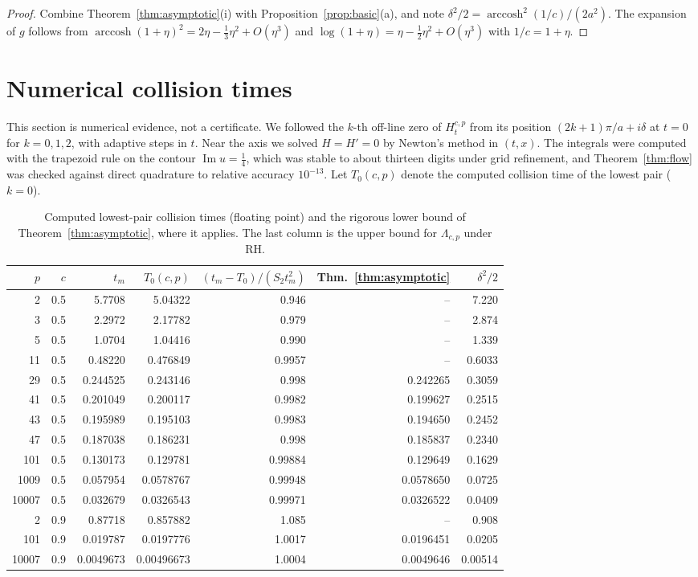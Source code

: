 \documentclass[11pt]{article}
\numberwithin{equation}{section}
\theoremstyle{definition}
\theoremstyle{remark}
\DeclareMathOperator{\Ima}{Im}
\DeclareMathOperator{\arccosh}{arccosh}
\begin{document}
\begin{proof}
Combine Theorem~\ref{thm:asymptotic}(i) with
Proposition~\ref{prop:basic}(a), and note $\delta^2/2=
\arccosh^2(1/c)/(2a^2)$. The expansion of $g$ follows from
$\arccosh(1+\eta)^2=2\eta-\tfrac13\eta^2+O(\eta^3)$ and
$\log(1+\eta)=\eta-\tfrac12\eta^2+O(\eta^3)$ with $1/c=1+\eta$.
\end{proof}

\section{Numerical collision times}\label{sec:numerics}

This section is numerical evidence, not a certificate. We followed the
$k$-th off-line zero of $H^{c,p}_t$ from its position $(2k+1)\pi/a+i\delta$
at $t=0$ for $k=0,1,2$, with adaptive steps in $t$. Near the axis we solved
$H=H'=0$ by Newton's method in $(t,x)$. The integrals were computed with
the trapezoid rule on the contour $\Ima u=\tfrac14$, which was stable to
about thirteen digits under grid refinement, and Theorem~\ref{thm:flow}
was checked against direct quadrature to relative accuracy $10^{-13}$. Let
$T_0(c,p)$ denote the computed collision time of the lowest pair ($k=0$).

\begin{table}[ht]
\centering\small
\begin{tabular}{rrrrrrr}
\toprule
$p$ & $c$ & $t_m$ & $T_0(c,p)$ & $(t_m-T_0)/(S_2t_m^2)$ & Thm.~\ref{thm:asymptotic} & $\delta^2/2$\\
\midrule
2 & 0.5 & 5.7708 & 5.04322 & 0.946 & -- & 7.220\\
3 & 0.5 & 2.2972 & 2.17782 & 0.979 & -- & 2.874\\
5 & 0.5 & 1.0704 & 1.04416 & 0.990 & -- & 1.339\\
11 & 0.5 & 0.48220 & 0.476849 & 0.9957 & -- & 0.6033\\
29 & 0.5 & 0.244525 & 0.243146 & 0.998 & 0.242265 & 0.3059\\
41 & 0.5 & 0.201049 & 0.200117 & 0.9982 & 0.199627 & 0.2515\\
43 & 0.5 & 0.195989 & 0.195103 & 0.9983 & 0.194650 & 0.2452\\
47 & 0.5 & 0.187038 & 0.186231 & 0.998 & 0.185837 & 0.2340\\
101 & 0.5 & 0.130173 & 0.129781 & 0.99884 & 0.129649 & 0.1629\\
1009 & 0.5 & 0.057954 & 0.0578767 & 0.99948 & 0.0578650 & 0.0725\\
10007 & 0.5 & 0.032679 & 0.0326543 & 0.99971 & 0.0326522 & 0.0409\\
2 & 0.9 & 0.87718 & 0.857882 & 1.085 & -- & 0.908\\
101 & 0.9 & 0.019787 & 0.0197776 & 1.0017 & 0.0196451 & 0.0205\\
10007 & 0.9 & 0.0049673 & 0.00496673 & 1.0004 & 0.0049646 & 0.00514\\
\bottomrule
\end{tabular}
\caption{Computed lowest-pair collision times (floating point) and the
rigorous lower bound of Theorem~\ref{thm:asymptotic}, where it applies. The
last column is the upper bound for $\Lambda_{c,p}$ under RH.}
\label{tab:numerics}
\end{table}
\end{document}

